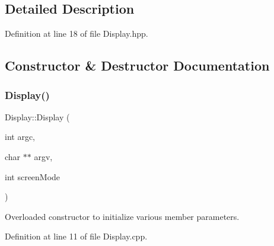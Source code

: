 \subsection{Detailed Description}


Definition at line 18 of file Display.\+hpp.



\subsection{Constructor \& Destructor Documentation}
\mbox{\label{classDisplay_a14f0b3465a13c09d9de5b5ed03ca824d}} 
\subsubsection{\texorpdfstring{Display()}{Display()}}
{\footnotesize\ttfamily Display\+::\+Display (\begin{DoxyParamCaption}\item[{int}]{argc,  }\item[{char $\ast$$\ast$}]{argv,  }\item[{int}]{screen\+Mode }\end{DoxyParamCaption})}

Overloaded constructor to initialize various member parameters. 

Definition at line 11 of file Display.\+cpp.


